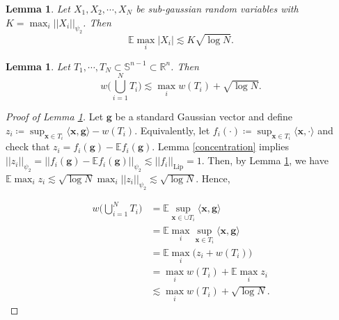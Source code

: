 \documentclass{article}
\newtheorem{lemma}[theorem]{Lemma}
\begin{document}
\begin{lemma} \label{max-subg}
Let $X_1, X_2, \cdots, X_N$ be sub-gaussian random variables with $K = \max_{i} ||X_i||_{\psi_2}$. Then
\begin{equation}
    \mathbb{E} \max_{i} |X_i| \lesssim K \sqrt{\log N}.
\end{equation}
\end{lemma}

\begin{lemma} \label{union-mean-width}
Let $T_1, \cdots, T_N \subset \mathbb{S}^{n-1} \subset \mathbb{R}^n$. Then
\begin{equation}
    w \big( \bigcup_{i=1}^{N} T_i \big) \lesssim \max_{i} w(T_i) + \sqrt{\log N}.
\end{equation}
\end{lemma}

\begin{proof}[Proof of Lemma \ref{union-mean-width}]
Let $\mathbf{g}$ be a standard Gaussian vector and define $z_i \coloneqq \sup_{\mathbf{x} \in T_i} \langle \mathbf{x}, \mathbf{g} \rangle - w(T_i)$. Equivalently, let $f_i(\cdot) \coloneqq \sup_{\mathbf{x} \in T_i} \langle \mathbf{x}, \cdot \rangle$ and check that $z_i = f_i(\mathbf{g}) - \mathbb{E}f_i(\mathbf{g})$. Lemma \ref{concentration} implies $||z_i||_{\psi_2} = ||f_i(\mathbf{g}) - \mathbb{E}f_i(\mathbf{g})||_{\psi_2} \lesssim ||f_i||_{\mathrm{Lip}} = 1$. Then, by Lemma \ref{max-subg}, we have $\mathbb{E} \max_{i} z_i \lesssim \sqrt{\log N} \max_{i} ||z_i||_{\psi_2} \lesssim \sqrt{\log N}$. Hence,


\begin{align}
    w\Big(\bigcup_{i=1}^{N} T_i \Big) & = \mathbb{E} \sup_{\mathbf{x} \in \cup T_i} \langle \mathbf{x}, \mathbf{g} \rangle \\
    & = \mathbb{E} \max_{i} \sup_{\mathbf{x} \in T_i} \langle \mathbf{x}, \mathbf{g} \rangle \\
    & = \mathbb{E} \max_{i} \big(z_i + w(T_i)\big) \\
    & = \max_{i} w(T_i) + \mathbb{E} \max_{i} z_i \\
    & \lesssim \max_{i} w(T_i) + \sqrt{\log N}.
\end{align}


\end{proof}
\end{document}
